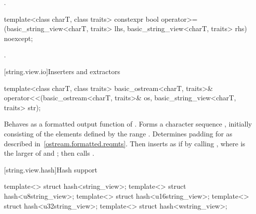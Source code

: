 \begin{itemdescr}
\pnum
\returns
{}.
\end{itemdescr}

%
\begin{itemdecl}
template<class charT, class traits>
  constexpr bool operator>=(basic_string_view<charT, traits> lhs,
                            basic_string_view<charT, traits> rhs) noexcept;
\end{itemdecl}

\begin{itemdescr}
\pnum
\returns
{}.
\end{itemdescr}

[string.view.io]{Inserters and extractors}

%
\begin{itemdecl}
template<class charT, class traits>
  basic_ostream<charT, traits>&
    operator<<(basic_ostream<charT, traits>& os, basic_string_view<charT, traits> str);
\end{itemdecl}

\begin{itemdescr}
\pnum
\effects
Behaves as a formatted output
function of . Forms a character sequence
, initially consisting of the elements defined by the range
. Determines padding for 
as described in~\ref{ostream.formatted.reqmts}.
Then inserts  as if by calling
, where  is the larger
of  and ;
then calls .

\pnum
\returns
{}
\end{itemdescr}

[string.view.hash]{Hash support}

%
%
%
%
%
\begin{itemdecl}
template<> struct hash<string_view>;
template<> struct hash<u8string_view>;
template<> struct hash<u16string_view>;
template<> struct hash<u32string_view>;
template<> struct hash<wstring_view>;
\end{itemdecl}

